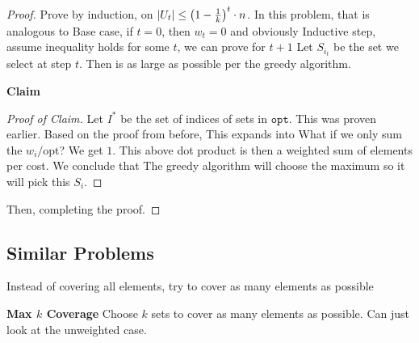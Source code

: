 \begin{proof}
    Prove by induction, on $\abs{U_t} \le \qty(1 - \frac{1}{k})^t \cdot n$. In this problem, that is analogous to
    Base case, if $t = 0$, then $w_t = 0$ and obviously
    Inductive step, assume inequality holds for some $t$,
    we can prove for $t+1$
    Let $S_{i_t}$ be the set we select at step $t$. Then
    is as large as possible per the greedy algorithm.
    \begin{lemma}
        \textbf{Claim}
    \end{lemma}
    \begin{proof}[Proof of Claim]
        Let $I^*$ be the set of indices of sets in $\texttt{opt}$.
        This was proven earlier. Based on the proof from before,
        This expands into
        What if we only sum the $w_i / \text{opt}$? We get $1$. This above dot product is then a weighted sum of elements per cost. We conclude that
        The greedy algorithm will choose the maximum so it will pick this $S_i$.
    \end{proof}
    
    Then,
    completing the proof.
\end{proof}

\subsection{Similar Problems}
Instead of covering all elements, try to cover as many elements as possible
\begin{definition}
    \textbf{Max $k$ Coverage}
    Choose $k$ sets to cover as many elements as possible. Can just look at the unweighted case.
\end{definition}

